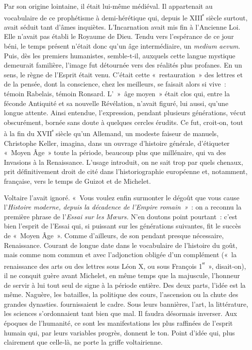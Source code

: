 \documentclass[french,twoside]{book} %
\begin{document}
\noindent  {}
\label{p91} Par son origine lointaine, il était lui-même médiéval. Il appartenait au vocabulaire de ce prophétisme à demi-hérétique qui, depuis le XIII\textsuperscript{ᵉ} siècle surtout, avait séduit tant d’âmes inquiètes. L’Incarnation avait mis fin à l’Ancienne Loi. Elle n’avait pas établi le Royaume de Dieu. Tendu vers l’espérance de ce jour béni, le temps présent n’était donc qu’un âge intermédiaire, un \emph{medium aevum.} Puis, dès les premiers huma­nistes, semble‑t‑il, auxquels cette langue mystique demeurait familière, l’image fut détournée vers des réalités plus profanes. En un sens, le règne de l’Esprit était venu. C’était cette « restauration » des lettres et de la pensée, dont la conscience, chez les meilleurs, se faisait alors si vive : témoin Rabelais, témoin Ronsard. L’ » âge moyen » était clos qui, entre la féconde Antiquité et sa nouvelle Révélation, n’avait figuré, lui aussi, qu’une longue attente. Ainsi entendue, l’expression, pendant plusieurs générations, vécut obscurément, bornée sans doute à quelques cercles érudits. Ce fut, croit‑on, tout à la fin du XVII\textsuperscript{ᵉ} siècle qu’un Allemand, un modeste faiseur de manuels, Christophe Keller, imagina, dans un ouvrage d’histoire générale, d’étiqueter « Moyen Âge » toute la période, beaucoup plus que millénaire, qui va des Invasions à la Renaissance. L’usage introduit, on ne sait trop par quels chenaux, prit définitivement droit de cité dans l’historiographie européenne et, notamment, française, vers le temps de Guizot et de Michelet.\par
Voltaire l’avait ignoré. « Vous voulez enfin surmonter le dégoût que vous cause l’\emph{Histoire moderne, depuis la décadence de l’Empire romain »} : on a reconnu la première phrase de l’\emph{Essai sur les Mœurs.} N’en doutons point pourtant : c’est bien l’esprit de l’Essai qui, si puissant sur les géné­rations suivantes, fit le succès de « Moyen Âge ». Comme d’ailleurs, de son pendant presque nécessaire, Renaissance. Courant de longue date dans le vocabulaire de l’histoire du goût, mais comme nom commun et avec l’adjonction obligée d’un complément (« la renaissance des arts ou des lettres sous Léon X, ou sous François 1\textsuperscript{ᵉʳ} », disait‑on), il ne conquit guère avant Michelet, en même temps que la majuscule, l’honneur de servir à lui tout seul de signe à la période entière. Des deux parts, l’idée est la même. Naguère, les batailles, la politique des cours, l’ascension ou la chute des grandes dynasties. fournissaient le cadre. Sous leurs ban­nières, l’art, la littérature, les sciences s’ordonnaient tant bien que mal. Il faudra désormais inverser. Aux époques de l’humanité, ce sont les manifestations les plus raffinées de l’esprit humain qui, par leurs variables progrès, donnent le ton. Point d’idée qui, plus clairement que celle‑là, ne porte la griffe voltairienne.\par
\end{document}
